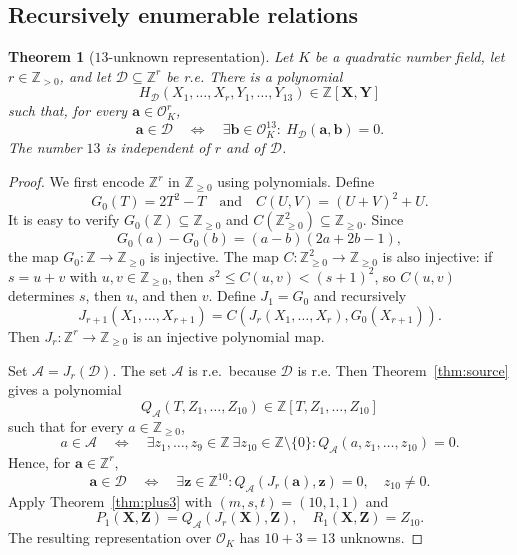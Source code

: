 \documentclass[12pt]{amsart}
\numberwithin{equation}{section}
\newtheorem{theorem}{Theorem}[section]
\theoremstyle{remark}
\theoremstyle{plain}
\newcommand{\Z}{\mathbb{Z}}
\newcommand{\sO}{\mathcal{O}}
\newcommand{\sD}{\mathcal{D}}
\newcommand{\sA}{\mathcal{A}}
\newcommand{\bX}{\mathbf{X}}
\newcommand{\bY}{\mathbf{Y}}
\newcommand{\bZ}{\mathbf{Z}}
\newcommand{\bz}{\mathbf{z}}
\newcommand{\ba}{\mathbf{a}}
\newcommand{\bb}{\mathbf{b}}
\begin{document}
\subsection{Recursively enumerable relations}\label{sec:re}
\begin{theorem}[$13$-unknown representation]\label{thm:re13}
Let $K$ be a quadratic number field, let $r\in\Z_{>0}$, and let $\sD\subseteq\Z^r$ be r.e. There is a polynomial
\[
H_{\sD}(X_1,\ldots,X_r,Y_1,\ldots,Y_{13})\in\Z[\bX,\bY]
\]
such that, for every $\ba\in\sO_K^r$,
\[
\ba\in\sD\quad\Longleftrightarrow\quad\exists\bb\in\sO_K^{13}\colon\ H_{\sD}(\ba,\bb)=0.
\]
The number $13$ is independent of $r$ and of $\sD$.
\end{theorem}
\begin{proof}
We first encode $\Z^r$ in $\Z_{\geq0}$ using polynomials. Define
\[
G_0(T)=2T^2-T\quad\text{and}\quad C(U,V)=(U+V)^2+U.
\]
It is easy to verify $G_0(\Z)\subseteq\Z_{\geq0}$ and $C(\Z_{\geq0}^2)\subseteq\Z_{\geq0}$. Since
\[
G_0(a)-G_0(b)=(a-b)(2a+2b-1),
\]
the map $G_0:\Z\to\Z_{\geq0}$ is injective. The map $C:\Z_{\geq0}^2\to\Z_{\geq0}$ is also injective: if $s=u+v$ with $u,v\in\Z_{\geq0}$, then
$s^2\leq C(u,v)<(s+1)^2$, so $C(u,v)$ determines $s$, then $u$, and then $v$.
Define $J_1=G_0$ and recursively
\[
J_{r+1}(X_1,\ldots,X_{r+1})
=C\left(J_r(X_1,\ldots,X_r),G_0(X_{r+1})\right).
\]
Then $J_r:\Z^r\to\Z_{\geq0}$ is an injective polynomial map.

Set $\sA=J_r(\sD)$. The set $\sA$ is r.e.\ because $\sD$ is r.e. Then Theorem~\ref{thm:source} gives a polynomial
\[
Q_{\sA}(T,Z_1,\ldots,Z_{10})\in\Z[T,Z_1,\ldots,Z_{10}]\]
such that for every $a\in\Z_{\geq0}$,
\[
a\in\sA\quad\Longleftrightarrow\quad
\exists z_1,\ldots,z_9\in\Z\ \exists z_{10}\in\Z\setminus\{0\}:
Q_{\sA}(a,z_1,\ldots,z_{10})=0.
\]
Hence, for $\ba\in\Z^r$,
\[
\ba\in\sD\quad\Longleftrightarrow\quad
\exists\bz\in\Z^{10}:
Q_{\sA}(J_r(\ba),\bz)=0,\quad z_{10}\neq0.
\]
Apply Theorem~\ref{thm:plus3} with $(m,s,t)=(10,1,1)$ and
\[
P_1(\bX,\bZ)=Q_{\sA}(J_r(\bX),\bZ),\quad R_1(\bX,\bZ)=Z_{10}.
\]
The resulting representation over $\sO_K$ has $10+3=13$ unknowns.
\end{proof}
\end{document}
